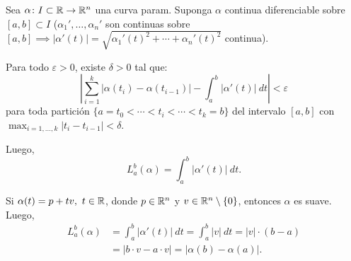 
Sea $\alpha \colon I \subset \mathbb{R} \to \mathbb{R}^{n}$ una curva param. Suponga $\alpha$ continua diferenciable sobre $[a,b] \subset I$ ($\alpha_{1}', \dots, \alpha_{n}'$ son continuas sobre $[a,b] \implies |\alpha'(t)| = \sqrt{\alpha_{1}'(t)^{2} + \cdots + \alpha_{n}'(t)^{2}}$ continua).

\begin{prop}
	Para todo $\varepsilon > 0$, existe $\delta > 0$ tal que:
	\[ \left| \sum_{i=1}^{k} |\alpha(t_{i}) - \alpha(t_{i-1})| - \int_{a}^{b} |\alpha'(t)| \ dt \right| < \varepsilon \]
	para toda partición $\{a = t_{0} < \cdots < t_{i} < \cdots < t_{k} = b\}$ del intervalo $[a,b]$ con $\max_{i = 1,\dots,k} |t_{i} - t_{i-1}| < \delta$. \par
	Luego,
	\[ L_{a}^{b}(\alpha) = \int_{a}^{b} |\alpha'(t)| \ dt. \]
\end{prop}

\begin{eg}
	Si $\alpha(t) = p + tv,\ t \in \mathbb{R}$, donde $p \in \mathbb{R}^{n}$ y $v \in \mathbb{R}^{n} \setminus \{0\}$, entonces $\alpha$ es suave. Luego,
	\begin{align*}
		L_{a}^{b}(\alpha) &= \int_{a}^{b} |\alpha'(t)| \ dt = \int_{a}^{b} |v| \ dt = |v| \cdot (b-a) \\
		&= |b \cdot v - a \cdot v| = |\alpha(b) - \alpha(a)|
	.\end{align*}
\end{eg}


